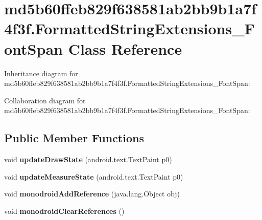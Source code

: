 \hypertarget{classmd5b60ffeb829f638581ab2bb9b1a7f4f3f_1_1_formatted_string_extensions___font_span}{}\section{md5b60ffeb829f638581ab2bb9b1a7f4f3f.\+Formatted\+String\+Extensions\+\_\+\+Font\+Span Class Reference}
\label{classmd5b60ffeb829f638581ab2bb9b1a7f4f3f_1_1_formatted_string_extensions___font_span}


Inheritance diagram for md5b60ffeb829f638581ab2bb9b1a7f4f3f.\+Formatted\+String\+Extensions\+\_\+\+Font\+Span\+:


Collaboration diagram for md5b60ffeb829f638581ab2bb9b1a7f4f3f.\+Formatted\+String\+Extensions\+\_\+\+Font\+Span\+:
\subsection*{Public Member Functions}
\begin{DoxyCompactItemize}
\item 
\mbox{\label{classmd5b60ffeb829f638581ab2bb9b1a7f4f3f_1_1_formatted_string_extensions___font_span_a97b8c1219694dcb15d384eef823d2e26}} 
void {\bfseries update\+Draw\+State} (android.\+text.\+Text\+Paint p0)
\item 
\mbox{\label{classmd5b60ffeb829f638581ab2bb9b1a7f4f3f_1_1_formatted_string_extensions___font_span_a7dae2ceacb0d10c2779b20b414c80a5b}} 
void {\bfseries update\+Measure\+State} (android.\+text.\+Text\+Paint p0)
\item 
\mbox{\label{classmd5b60ffeb829f638581ab2bb9b1a7f4f3f_1_1_formatted_string_extensions___font_span_a943edf05988a3ee0617593770d19dc2e}} 
void {\bfseries monodroid\+Add\+Reference} (java.\+lang.\+Object obj)
\item 
\mbox{\label{classmd5b60ffeb829f638581ab2bb9b1a7f4f3f_1_1_formatted_string_extensions___font_span_ac530c8771610db1c7c647982314f8a4e}} 
void {\bfseries monodroid\+Clear\+References} ()
\end{DoxyCompactItemize}
